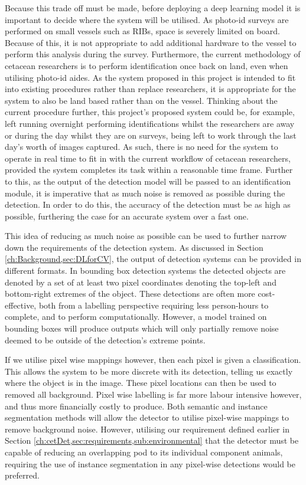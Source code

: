  Because this trade off must be made, before deploying a deep learning model it is important to decide where the system will be utilised. As photo-id surveys are performed on small vessels such as RIBs, space is severely limited on board. Because of this, it is not appropriate to add additional hardware to the vessel to perform this analysis during the survey. Furthermore, the current methodology of cetacean researchers is to perform identification once back on land, even when utilising photo-id aides. As the system proposed in this project is intended to fit into existing procedures rather than replace researchers, it is appropriate for the system to also be land based rather than on the vessel. Thinking about the current procedure further, this project's proposed system could be, for example, left running overnight performing identifications whilst the researchers are away or during the day whilst they are on surveys, being left to work through the last day's worth of images captured. As such, there is no need for the system to operate in real time to fit in with the current workflow of cetacean researchers, provided the system completes its task within a reasonable time frame. Further to this, as the output of the detection model will be passed to an identification module, it is imperative that as much noise is removed as possible during the detection. In order to do this, the accuracy of the detection must be as high as possible, furthering the case for an accurate system over a fast one.
 
  This idea of reducing as much noise as possible can be used to further narrow down the requirements of the detection system. As discussed in Section \ref{ch:Background,sec:DLforCV}, the output of detection systems can be provided in different formats. In bounding box detection systems the detected objects are denoted by a set of at least two pixel coordinates denoting the top-left and bottom-right extremes of the object. These detections are often more cost-effective, both from a labelling perspective requiring less person-hours to complete, and to perform computationally. However, a model trained on bounding boxes will produce outputs which will only partially remove noise deemed to be outside of the detection's extreme points.
 
 If we utilise pixel wise mappings however, then each pixel is given a classification. This allows the system to be more discrete with its detection, telling us exactly where the object is in the image. These pixel locations can then be used to removed all background. Pixel wise labelling is far more labour intensive however, and thus more financially costly to produce. Both semantic and instance segmentation methods will allow the detector to utilise pixel-wise mappings to remove background noise. However, utilising our requirement defined earlier in Section \ref{ch:cetDet,sec:requirements,sub:environmental} that the detector must be capable of reducing an overlapping pod to its individual component animals, requiring the use of instance segmentation in any pixel-wise detections would be preferred. 
 
